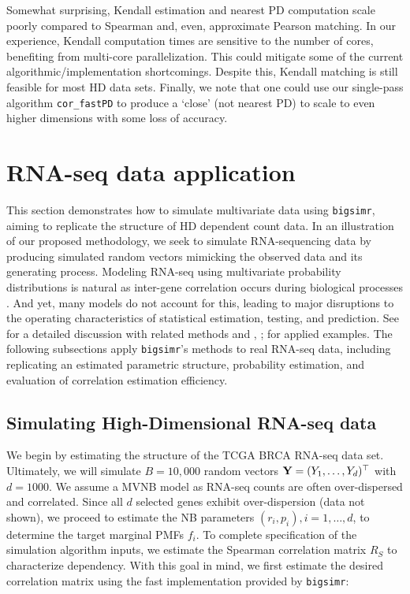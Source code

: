 \documentclass[
]{jss}
\begin{document}
Somewhat surprising, Kendall estimation and nearest PD computation scale poorly compared to Spearman and, even, approximate Pearson matching. In our experience, Kendall computation times are sensitive to the number of cores, benefiting from multi-core parallelization. This could mitigate some of the current algorithmic/implementation shortcomings. Despite this, Kendall matching is still feasible for most HD data sets. Finally, we note that one could use our single-pass algorithm \texttt{cor\_fastPD} to produce a `close' (not nearest PD) to scale to even higher dimensions with some loss of accuracy.

\hypertarget{examples}{%
\section{RNA-seq data application}\label{examples}}

This section demonstrates how to simulate multivariate data using \texttt{bigsimr}, aiming to replicate the structure of HD dependent count data. In an illustration of our proposed methodology, we seek to simulate RNA-sequencing data by producing simulated random vectors mimicking the observed data and its generating process. Modeling RNA-seq using multivariate probability distributions is natural as inter-gene correlation occurs during biological processes \citep{Wang2009b}. And yet, many models do not account for this, leading to major disruptions to the operating characteristics of statistical estimation, testing, and prediction. See \citet{Efron2012} for a detailed discussion with related methods and \citet{Wu2012b}, \citet{Schissler2018}; \citet{Schissler2019} for applied examples. The following subsections apply \texttt{bigsimr}'s methods to real RNA-seq data, including replicating an estimated parametric structure, probability estimation, and evaluation of correlation estimation efficiency.

\hypertarget{simulating-high-dimensional-rna-seq-data}{%
\subsection{Simulating High-Dimensional RNA-seq data}\label{simulating-high-dimensional-rna-seq-data}}

We begin by estimating the structure of the TCGA BRCA RNA-seq data set. Ultimately, we will simulate \(B=10,000\) random vectors \({\bf Y}=(Y_1, \ldots, Y_d)^\top\) with \(d=1000\). We assume a MVNB model as RNA-seq counts are often over-dispersed and correlated. Since all \(d\) selected genes exhibit over-dispersion (data not shown), we proceed to estimate the NB parameters \((r_i, p_i), i=1,\ldots,d\), to determine the target marginal PMFs \(f_i\). To complete specification of the simulation algorithm inputs, we estimate the Spearman correlation matrix \(R_S\) to characterize dependency. With this goal in mind, we first estimate the desired correlation matrix using the fast implementation provided by \texttt{bigsimr}:
\end{document}
